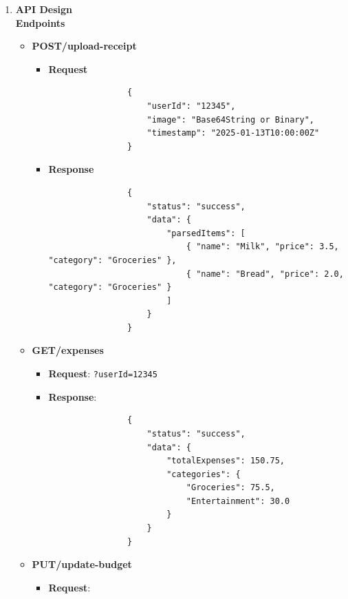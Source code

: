 \documentclass[12pt, titlepage]{article}
\begin{document}
\begin{enumerate}
\begin{itemize}
\begin{itemize}
\begin{itemize}
				\item Updates user budgets based on inputs.
				\item Runs predictive models for forecasting.
			\end{itemize}
			\item \textbf{Response}:
			\begin{itemize}
				\item Sends updated data or predictions to the front end.
			\end{itemize}
		\end{itemize}
	\end{itemize}
	\newpage
	\item \textbf{API Design}
	\\ \textbf{Endpoints}
	\begin{itemize}
		\item \textbf{POST/upload-receipt}
		\begin{itemize}
			\item \textbf{Request}
			\begin{verbatim}
				{
					"userId": "12345",
					"image": "Base64String or Binary",
					"timestamp": "2025-01-13T10:00:00Z"
				}
			\end{verbatim}
			\item \textbf{Response}
			\begin{verbatim}
				{
					"status": "success",
					"data": {
						"parsedItems": [
							{ "name": "Milk", "price": 3.5, "category": "Groceries" },
							{ "name": "Bread", "price": 2.0, "category": "Groceries" }
						]
					}
				}
			\end{verbatim}
		\end{itemize}
		\item \textbf{GET/expenses}
		\begin{itemize}
			\item \textbf{Request}: \texttt{?userId=12345}
			\item \textbf{Response}:
			\begin{verbatim}
				{
					"status": "success",
					"data": {
						"totalExpenses": 150.75,
						"categories": {
							"Groceries": 75.5,
							"Entertainment": 30.0
						}
					}
				}
			\end{verbatim}
		\end{itemize}
		\item \textbf{PUT/update-budget}
		\begin{itemize}
			\item \textbf{Request}:
			\begin{verbatim}

\end{verbatim}
\end{itemize}
\end{itemize}
\end{enumerate}
\end{document}
